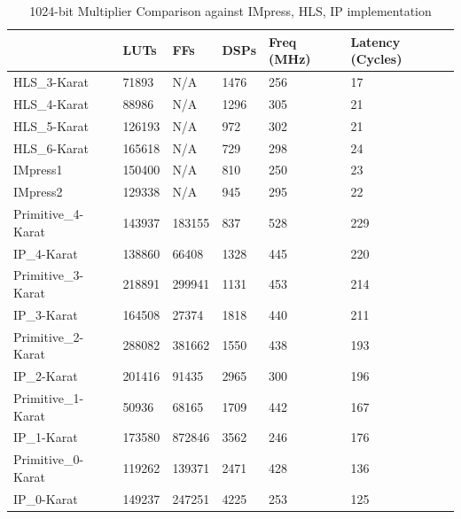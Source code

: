 \begin{table}[t]
\centering
\caption{1024-bit Multiplier Comparison against IMpress, HLS, IP implementation}
\begin{tabular}[t]{
p{\scaleResultTable\linewidth} @{\hspace{20pt}}
p{\scaleResultTable\linewidth} 
p{\scaleResultTable\linewidth} 
p{\scaleResultTable\linewidth}@{\hspace{4pt}} p{\scaleResultTable\linewidth}@{\hspace{20pt}} 
p{\scaleResultTable\linewidth}  @{}
}

\toprule
\textbf{}&\textbf{LUTs}&\textbf{FFs}&\textbf{DSPs}&\textbf{Freq (MHz)}&\textbf{Latency (Cycles)}\\
\midrule

HLS\_3-Karat&71893&N/A&1476&256&17\\
\hline
HLS\_4-Karat&88986&N/A&1296&305&21\\
\hline
HLS\_5-Karat&126193&N/A&972&302&21\\
\hline
HLS\_6-Karat&165618&N/A&729&298&24\\
\hline
IMpress1\cite{zhangIMpressLargeInteger2022}&150400&N/A&810&250&23\\
\hline
IMpress2\cite{zhangIMpressLargeInteger2022}&129338&N/A&945&295&22\\
\hline
Primitive\_4-Karat&143937&183155&837&528&229\\
\hline
IP\_4-Karat&138860&66408&1328&445&220\\
\hline
Primitive\_3-Karat&218891&299941&1131&453&214\\
\hline
IP\_3-Karat&164508&27374&1818&440&211\\
\hline
Primitive\_2-Karat&288082&381662&1550&438&193\\
\hline
IP\_2-Karat&201416&91435&2965&300&196\\
\hline
Primitive\_1-Karat&50936&68165&1709&442&167\\
\hline
IP\_1-Karat&173580&872846&3562&246&176\\
\hline
Primitive\_0-Karat&119262&139371&2471&428&136\\
\hline
IP\_0-Karat&149237&247251&4225&253&125\\
\hline

\bottomrule
\end{tabular}
\label{table_1024_res_comparison}
\end{table}


